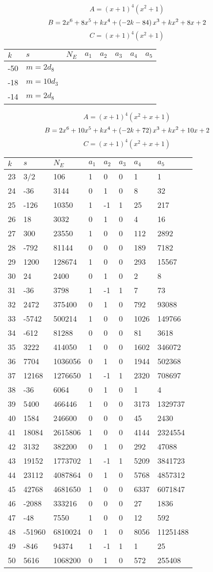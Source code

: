 \documentclass{amsart}
\begin{document}
$$A=(x
 + 1)^{4}(x^2
 + 1)$$
$$B=2\*x^6
 + 8\*x^5
 + k\*x^4
 + \left(-2\*k
 - 84\right) \*x^3
 + k\*x^2
 + 8\*x
 + 2$$
$$C=(x
 + 1)^{4}(x^2
 + 1)$$
\begin{longtable}{|l|l|l|lllll|}
\hline
$k$ & $s$ & $N_E$ & $a_1$ & $a_2$ & $a_3$ & $a_4$ & $a_5$\\
\hline
-50&$m=2d_{8}$&&\multicolumn{5}{c|}{}\\
-18&$m=10d_{3}$&&\multicolumn{5}{c|}{}\\
-14&$m=2d_{8}$&&\multicolumn{5}{c|}{}\\
\hline
\end{longtable}
$$A=(x
 + 1)^{4}(x^2
 + x
 + 1)$$
$$B=2\*x^6
 + 10\*x^5
 + k\*x^4
 + \left(-2\*k
 + 72\right) \*x^3
 + k\*x^2
 + 10\*x
 + 2$$
$$C=(x
 + 1)^{4}(x^2
 + x
 + 1)$$
\begin{longtable}{|l|l|l|lllll|}
\hline
$k$ & $s$ & $N_E$ & $a_1$ & $a_2$ & $a_3$ & $a_4$ & $a_5$\\
\hline
23&3/2&106&1&0&0&1&1\\
24&-36&3144&0&1&0&8&32\\
25&-126&10350&1&-1&1&25&217\\
26&18&3032&0&1&0&4&16\\
27&300&23550&1&0&0&112&2892\\
28&-792&81144&0&0&0&189&7182\\
29&1200&128674&1&0&0&293&15567\\
30&24&2400&0&1&0&2&8\\
31&-36&3798&1&-1&1&7&73\\
32&2472&375400&0&1&0&792&93088\\
33&-5742&500214&1&0&0&1026&149766\\
34&-612&81288&0&0&0&81&3618\\
35&3222&414050&1&0&0&1602&346072\\
36&7704&1036056&0&1&0&1944&502368\\
37&12168&1276650&1&-1&1&2320&708697\\
38&-36&6064&0&1&0&1&4\\
39&5400&466446&1&0&0&3173&1329737\\
40&1584&246600&0&0&0&45&2430\\
41&18084&2615806&1&0&0&4144&2324554\\
42&3132&382200&0&1&0&292&47088\\
43&19152&1773702&1&-1&1&5209&3841723\\
44&23112&4087864&0&1&0&5768&4857312\\
45&42768&4681650&1&0&0&6337&6071847\\
46&-2088&333216&0&0&0&27&1836\\
47&-48&7550&1&0&0&12&592\\
48&-51960&6810024&0&1&0&8056&11251488\\
49&-846&94374&1&-1&1&1&25\\
50&5616&1068200&0&1&0&572&255408\\
\hline
\end{longtable}
\end{document}
